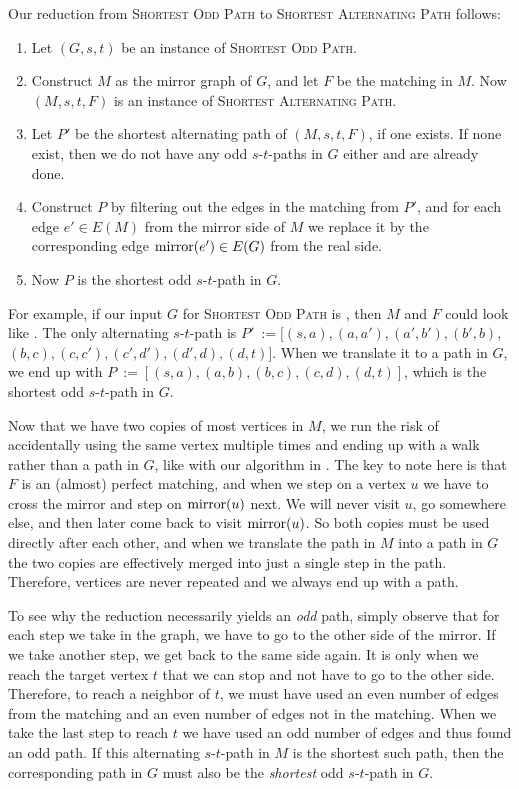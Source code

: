 Our reduction from \textsc{Shortest Odd Path} to \textsc{Shortest Alternating Path} follows:
\begin{enumerate}
    \item Let $(G, s, t)$ be an instance of \textsc{Shortest Odd Path}.
    \item Construct $M$ as the mirror graph of $G$, and let $F$ be the matching in $M$. Now $(M, s, t, F)$ is an instance of \textsc{Shortest Alternating Path}.
    \item Let $P'$ be the shortest alternating path of $(M, s, t, F)$, if one exists. If none exist, then we do not have any odd $s$-$t$-paths in $G$ either and are already done.
    \item Construct $P$ by filtering out the edges in the matching from $P'$, and for each edge $e' \in E(M)$ from the mirror side of $M$ we replace it by the corresponding edge $\operatorname{mirror}(e') \in E(G)$ from the real side.
    \label{point:translate_alternating_path}
    \item Now $P$ is the shortest odd $s$-$t$-path in $G$.
\end{enumerate}

For example, if our input $G$ for \textsc{Shortest Odd Path} is , then $M$ and $F$ could look like . The only alternating $s$-$t$-path is $P'~:= [(s,a), (a, a'), (a',b'), (b',b)$, $(b,c), (c,c'), (c',d'), (d',d), (d,t)]$. When we translate it to a path in $G$, we end up with $P~:= [(s,a),(a,b),(b,c),(c,d),(d,t)]$, which is the shortest odd $s$-$t$-path in $G$. 

Now that we have two copies of most vertices in $M$, we run the risk of accidentally using the same vertex multiple times and ending up with a walk rather than a path in $G$, like with our algorithm in . The key to note here is that $F$ is an (almost) perfect matching, and when we step on a vertex $u$ we have to cross the mirror and step on $\operatorname{mirror}(u)$ next. We will never visit $u$, go somewhere else, and then later come back to visit $\operatorname{mirror}(u)$. So both copies must be used directly after each other, and when we translate the path in $M$ into a path in $G$ the two copies are effectively merged into just a single step in the path. Therefore, vertices are never repeated and we always end up with a path.

To see why the reduction necessarily yields an \emph{odd} path, simply observe that for each step we take in the graph, we have to go to the other side of the mirror. If we take another step, we get back to the same side again. It is only when we reach the target vertex $t$ that we can stop and not have to go to the other side. Therefore, to reach a neighbor of $t$, we must have used an even number of edges from the matching and an even number of edges not in the matching. When we take the last step to reach $t$ we have used an odd number of edges and thus found an odd path. If this alternating $s$-$t$-path in $M$ is the shortest such path, then the corresponding path in $G$ must also be the \emph{shortest} odd $s$-$t$-path in $G$. 

